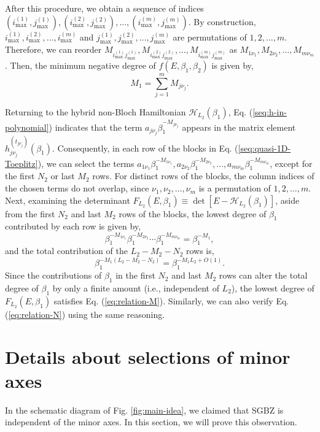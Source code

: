 After this procedure, we obtain a sequence of indices $(i_{\max}^{(1)},j_{\max}^{(1)}),(i_{\max}^{(2)},j_{\max}^{(2)}),\dots,(i_{\max}^{(m)},j_{\max}^{(m)})$.
By construction, $i_{\max}^{(1)},i_{\max}^{(2)},\dots,i_{\max}^{(m)}$
and $j_{\max}^{(1)},j_{\max}^{(2)},\dots,j_{\max}^{(m)}$ are permutations
of $1,2,\dots,m$. Therefore, we can reorder $M_{i_{\max}^{(1)}j_{\max}^{(1)}},M_{i_{\max}^{(2)}j_{\max}^{(2)}},\dots,M_{i_{\max}^{(m)}j_{\max}^{(m)}}$
as $M_{1\nu_{1}},M_{2\nu_{2}},\dots,M_{m\nu_{m}}$. Then, the minimum
negative degree of $f(E,\beta_{1},\beta_{2})$ is given by, 
\begin{equation}
M_{1}=\sum_{j=1}^{m}M_{j\nu_{j}}.
\end{equation}

Returning to the hybrid non-Bloch Hamiltonian $\mathcal{H}_{L_{2}}(\beta_{1})$,
Eq. (\ref{seq:h-in-polynomial}) indicates that the term $a_{j\nu_{j}}\beta_{1}^{-M_{j\nu_{j}}}$
appears in the matrix element $h_{j\nu_{j}}^{(t_{j\nu_{j}})}(\beta_{1})$.
Consequently, in each row of the blocks in Eq. (\ref{seq:quasi-1D-Toeplitz}),
we can select the terms $a_{1\nu_{1}}\beta_{1}^{-M_{1\nu_{1}}},a_{2\nu_{2}}\beta_{1}^{-M_{2\nu_{2}}},\dots,a_{m\nu_{m}}\beta_{1}^{-M_{m\nu_{m}}}$,
except for the first $N_{2}$ or last $M_{2}$ rows. For distinct
rows of the blocks, the column indices of the chosen terms do not
overlap, since $\nu_{1},\nu_{2},\dots,\nu_{m}$ is a permutation of
$1,2,\dots,m$. Next, examining the determinant $F_{L_{2}}(E,\beta_{1})\equiv\det[E-\mathcal{H}_{L_{2}}(\beta_{1})]$,
aside from the first $N_{2}$ and last $M_{2}$ rows of the blocks,
the lowest degree of $\beta_{1}$ contributed by each row is given
by, 
\[
\beta_{1}^{-M_{1\nu_{1}}}\beta_{1}^{-M_{2\nu_{2}}}\cdots\beta_{1}^{-M_{m\nu_{m}}}=\beta_{1}^{-M_{1}},
\]
and the total contribution of the $L_{2}-M_{2}-N_{2}$ rows is, 
\[
\beta_{1}^{-M_{1}\left(L_{2}-M_{2}-N_{2}\right)}=\beta_{1}^{-M_{1}L_{2}+O(1)}.
\]
Since the contributions of $\beta_{1}$ in the first $N_{2}$ and
last $M_{2}$ rows can alter the total degree of $\beta_{1}$ by only
a finite amount (i.e., independent of $L_{2}$), the lowest degree
of $F_{L_{2}}(E,\beta_{1})$ satisfies Eq. (\ref{eq:relation-M}).
Similarly, we can also verify Eq. (\ref{eq:relation-N}) using the
same reasoning.

\section{Details about selections of minor axes}

In the schematic diagram of Fig. \ref{fig:main-idea}, we claimed
that SGBZ is independent of the minor axes. In this section, we will
prove this observation.

